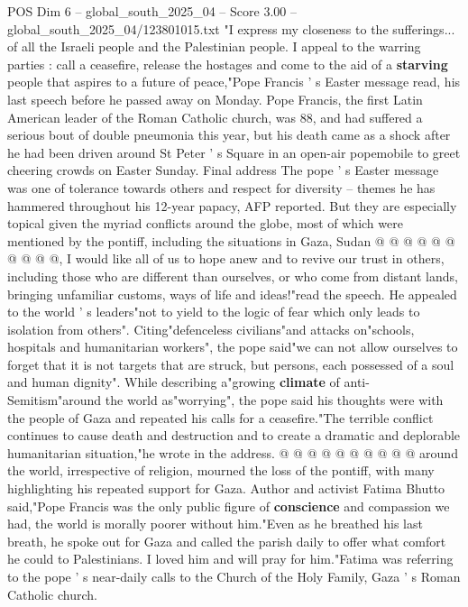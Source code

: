 \begin{textsample}{POS Dim 6 – global\_south\_2025\_04 – Score 3.00 – global\_south\_2025\_04/123801015.txt}  \label{ex:f6_pos_286}
"I express my closeness to the sufferings... of all the Israeli people and the Palestinian people.
I appeal to the warring parties : call a ceasefire, release the hostages and come to the aid of a \textbf{starving} people that aspires to a future of peace,"Pope Francis ' s Easter message read, his last speech before he passed away on Monday.
Pope Francis, the first Latin American leader of the Roman Catholic church, was 88, and had suffered a serious bout of double pneumonia this year, but his death came as a shock after he had been driven around St Peter ' s Square in an open-air popemobile to greet cheering crowds on Easter Sunday.
Final address The pope ' s Easter message was one of tolerance towards others and respect for diversity -- themes he has hammered throughout his 12-year papacy, AFP reported.
But they are especially topical given the myriad conflicts around the globe, most of which were mentioned by the pontiff, including the situations in Gaza, Sudan @ @ @ @ @ @ @ @ @ @, I would like all of us to hope anew and to revive our trust in others, including those who are different than ourselves, or who come from distant lands, bringing unfamiliar customs, ways of life and ideas!"read the speech.
He appealed to the world ' s leaders"not to yield to the logic of fear which only leads to isolation from others".
Citing"defenceless civilians"and attacks on"schools, hospitals and humanitarian workers", the pope said"we can not allow ourselves to forget that it is not targets that are struck, but persons, each possessed of a soul and human dignity".
While describing a"growing \textbf{climate} of anti-Semitism"around the world as"worrying", the pope said his thoughts were with the people of Gaza and repeated his calls for a ceasefire."The terrible conflict continues to cause death and destruction and to create a dramatic and deplorable humanitarian situation,"he wrote in the address. @ @ @ @ @ @ @ @ @ @ around the world, irrespective of religion, mourned the loss of the pontiff, with many highlighting his repeated support for Gaza.
Author and activist Fatima Bhutto said,"Pope Francis was the only public figure of \textbf{conscience} and compassion we had, the world is morally poorer without him."Even as he breathed his last breath, he spoke out for Gaza and called the parish daily to offer what comfort he could to Palestinians.
I loved him and will pray for him."Fatima was referring to the pope ' s near-daily calls to the Church of the Holy Family, Gaza ' s Roman Catholic church.

\end{textsample}
